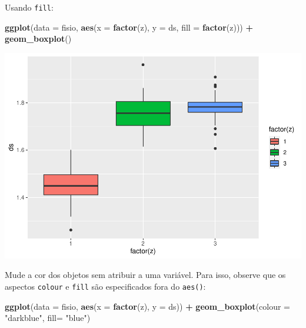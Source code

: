 \documentclass[
]{book}
\newenvironment{Shaded}{\begin{snugshade}}{\end{snugshade}}
\newcommand{\DataTypeTok}[1]{\textcolor[rgb]{0.13,0.29,0.53}{#1}}
\newcommand{\KeywordTok}[1]{\textcolor[rgb]{0.13,0.29,0.53}{\textbf{#1}}}
\newcommand{\NormalTok}[1]{#1}
\newcommand{\OperatorTok}[1]{\textcolor[rgb]{0.81,0.36,0.00}{\textbf{#1}}}
\newcommand{\StringTok}[1]{\textcolor[rgb]{0.31,0.60,0.02}{#1}}
\begin{document}
Usando \texttt{fill}:

\begin{Shaded}
\begin{Highlighting}[]
\KeywordTok{ggplot}\NormalTok{(}\DataTypeTok{data =}\NormalTok{ fisio, }\KeywordTok{aes}\NormalTok{(}\DataTypeTok{x =} \KeywordTok{factor}\NormalTok{(z), }\DataTypeTok{y =}\NormalTok{ ds, }\DataTypeTok{fill =} \KeywordTok{factor}\NormalTok{(z))) }\OperatorTok{+}
\StringTok{  }\KeywordTok{geom_boxplot}\NormalTok{()}
\end{Highlighting}
\end{Shaded}

\includegraphics{TudodoR_files/figure-latex/unnamed-chunk-201-1.pdf}

Mude a cor dos objetos sem atribuir a uma variável. Para isso, observe que os aspectos \texttt{colour} e \texttt{fill} são especificados fora do \texttt{aes()}:

\begin{Shaded}
\begin{Highlighting}[]
\KeywordTok{ggplot}\NormalTok{(}\DataTypeTok{data =}\NormalTok{ fisio, }\KeywordTok{aes}\NormalTok{(}\DataTypeTok{x =} \KeywordTok{factor}\NormalTok{(z), }\DataTypeTok{y =}\NormalTok{ ds)) }\OperatorTok{+}
\StringTok{  }\KeywordTok{geom_boxplot}\NormalTok{(}\DataTypeTok{colour =} \StringTok{"darkblue"}\NormalTok{, }\DataTypeTok{fill=} \StringTok{"blue"}\NormalTok{)}
\end{Highlighting}
\end{Shaded}
\end{document}
